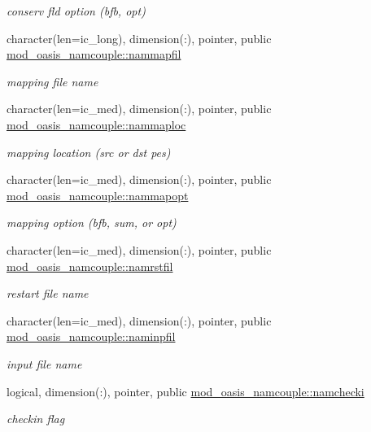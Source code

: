 \begin{DoxyCompactItemize}
\begin{DoxyCompactList}\small\item\em conserv fld option (bfb, opt) \end{DoxyCompactList}\item 
character(len=ic\+\_\+long), dimension(\+:), pointer, public \hyperlink{namespacemod__oasis__namcouple_a9fc6ac674a8cfa68d9d15ad13213e21d}{mod\+\_\+oasis\+\_\+namcouple\+::nammapfil}
\begin{DoxyCompactList}\small\item\em mapping file name \end{DoxyCompactList}\item 
character(len=ic\+\_\+med), dimension(\+:), pointer, public \hyperlink{namespacemod__oasis__namcouple_a7316d7d322da7cf10f315e38c145ebbb}{mod\+\_\+oasis\+\_\+namcouple\+::nammaploc}
\begin{DoxyCompactList}\small\item\em mapping location (src or dst pes) \end{DoxyCompactList}\item 
character(len=ic\+\_\+med), dimension(\+:), pointer, public \hyperlink{namespacemod__oasis__namcouple_ad2554b4881fa63780dd5e6fe78d705ef}{mod\+\_\+oasis\+\_\+namcouple\+::nammapopt}
\begin{DoxyCompactList}\small\item\em mapping option (bfb, sum, or opt) \end{DoxyCompactList}\item 
character(len=ic\+\_\+med), dimension(\+:), pointer, public \hyperlink{namespacemod__oasis__namcouple_a54f4b8262f809a20928092782bc78345}{mod\+\_\+oasis\+\_\+namcouple\+::namrstfil}
\begin{DoxyCompactList}\small\item\em restart file name \end{DoxyCompactList}\item 
character(len=ic\+\_\+med), dimension(\+:), pointer, public \hyperlink{namespacemod__oasis__namcouple_a15fc11ff1c1d5718ff127a06a205a82c}{mod\+\_\+oasis\+\_\+namcouple\+::naminpfil}
\begin{DoxyCompactList}\small\item\em input file name \end{DoxyCompactList}\item 
logical, dimension(\+:), pointer, public \hyperlink{namespacemod__oasis__namcouple_a7c88a329c97aea020e9b135bdca8d160}{mod\+\_\+oasis\+\_\+namcouple\+::namchecki}
\begin{DoxyCompactList}\small\item\em checkin flag \end{DoxyCompactList}\item 

\end{DoxyCompactItemize}
